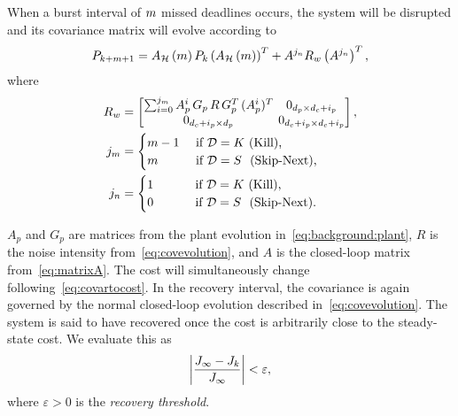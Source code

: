 When a burst interval of $m$ missed deadlines occurs,
the system will be disrupted and its covariance matrix will
evolve according to
%
\begin{equation}
\label{eq:covariance-evolution}
    P_{k+m+1} = A_{\mathcal{H}}\left(m\right) P_k \left( A_{\mathcal{H}}\left(m\right) \right)^T + A^{j_{n}} R_w \left( A^{j_{n}} \right)^T,
\end{equation}
where
\begin{equation}
\label{eq:evolutionparameters}
\setlength\arraycolsep{2pt}
    \begin{aligned}
        R_w &= 
        \begin{bmatrix} 
            \sum_{i=0}^{j_{\nummisses}} A_p^i\,G_p\,R\,G_p^T\,(A_p^i)^T & 0_{\numstatesplant \times \numstatesctl+\numinputplant} \\ 
            0_{\numstatesctl + \numinputplant \times \numstatesplant}               & 0_{\numstatesctl + \numinputplant \times \numstatesctl+ \numinputplant}
        \end{bmatrix}, \\
        j_{\nummisses} &= 
        \begin{cases} 
            \nummisses - 1 & \text{ if } \dstrat = K\,\, \text{(Kill),} \\ 
            \nummisses & \text{ if } \dstrat = S\,\,\,\, \text{(Skip-Next),} 
        \end{cases} \\
        j_{\numhits} &= 
        \begin{cases} 
            1 \phantom{||222} & \text{ if } \dstrat = K\,\, \text{(Kill),} \\ 
            0 & \text{ if } \dstrat = S\,\,\,\, \text{(Skip-Next).}
        \end{cases}
        \end{aligned}
\end{equation}

$A_p$ and $G_p$ are matrices from the plant 
evolution in~\eqref{eq:background:plant}, $R$ is the noise intensity 
from~\eqref{eq:covevolution}, and $A$ is the closed-loop matrix 
from~\eqref{eq:matrixA}. The cost will simultaneously change 
following~\eqref{eq:covartocost}. In the recovery interval, the
covariance is again governed by the normal closed-loop evolution
described in~\eqref{eq:covevolution}. The system is said
to have recovered once the cost is arbitrarily close to the
steady-state cost. We evaluate this as
%
\begin{equation}
    \label{eq:cost-threshold}
    \left|\frac{J_{\infty}-J_k}{J_\infty}\right| < \varepsilon,
\end{equation}
where $\varepsilon> 0$ is the \emph{recovery threshold}.

